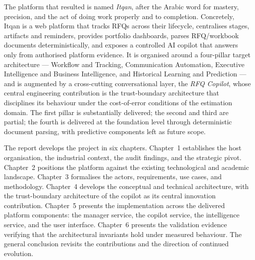 The platform that resulted is named \textit{Itqan}, after the Arabic word for mastery, precision, and the act of doing work properly and to completion. Concretely, Itqan is a web platform that tracks RFQs across their lifecycle, centralises stages, artifacts and reminders, provides portfolio dashboards, parses RFQ/workbook documents deterministically, and exposes a controlled AI copilot that answers only from authorised platform evidence. It is organised around a four-pillar target architecture --- Workflow and Tracking, Communication Automation, Executive Intelligence and Business Intelligence, and Historical Learning and Prediction --- and is augmented by a cross-cutting conversational layer, the \textit{RFQ Copilot}, whose central engineering contribution is the trust-boundary architecture that disciplines its behaviour under the cost-of-error conditions of the estimation domain. The first pillar is substantially delivered; the second and third are partial; the fourth is delivered at the foundation level through deterministic document parsing, with predictive components left as future scope.

The report develops the project in six chapters. Chapter~1 establishes the host organisation, the industrial context, the audit findings, and the strategic pivot. Chapter~2 positions the platform against the existing technological and academic landscape. Chapter~3 formalises the actors, requirements, use cases, and methodology. Chapter~4 develops the conceptual and technical architecture, with the trust-boundary architecture of the copilot as its central innovation contribution. Chapter~5 presents the implementation across the delivered platform components: the manager service, the copilot service, the intelligence service, and the user interface. Chapter~6 presents the validation evidence verifying that the architectural invariants hold under measured behaviour. The general conclusion revisits the contributions and the direction of continued evolution.
